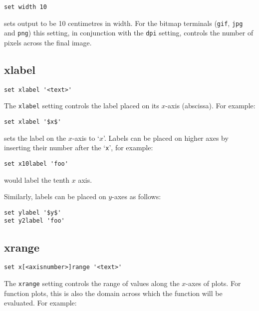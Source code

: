 \documentclass[a4paper,onecolumn,11pt]{book}
\begin{document}
\begin{verbatim}
set width 10
\end{verbatim}

\noindent sets output to be 10 centimetres in width.  For the bitmap terminals ({\tt gif},
{\tt jpg} and {\tt png}) this setting, in conjunction with the {\tt dpi}
setting, controls the number of pixels across the final image.

\subsection{xlabel}

\begin{verbatim}
set xlabel '<text>'
\end{verbatim}

The {\tt xlabel} setting controls the label placed on its $x$-axis (abscissa).
For example:

\begin{verbatim}
set xlabel '$x$'
\end{verbatim}

\noindent sets the label on the $x$-axis to `$x$'.  Labels can be placed on higher axes by
inserting their number after the `\texttt{x}', for example:

\begin{verbatim}
set x10label 'foo'
\end{verbatim}

\noindent would label the tenth $x$ axis.

Similarly, labels can be placed on $y$-axes as follows:

\begin{verbatim}
set ylabel '$y$' 
set y2label 'foo'
\end{verbatim}


\subsection{xrange}

\begin{verbatim}
set x[<axisnumber>]range '<text>'
\end{verbatim}

The {\tt xrange} setting controls the range of values along the $x$-axes of
plots.  For function plots, this is also the domain across which the function
will be evaluated.  For example:
\end{document}
